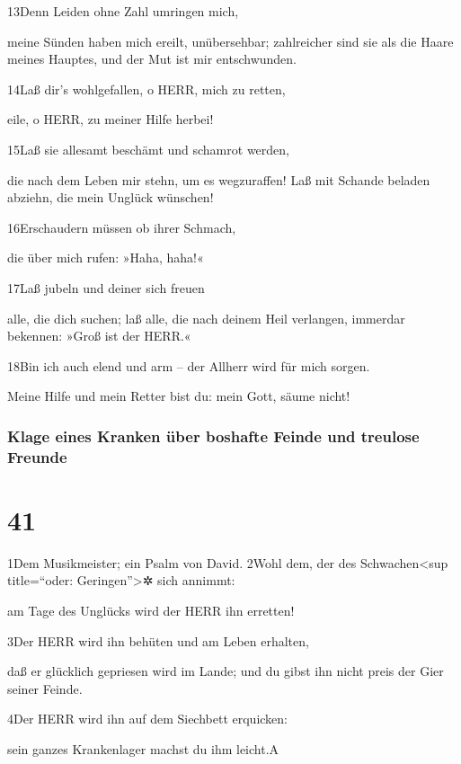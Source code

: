 13Denn Leiden ohne Zahl umringen mich,

meine Sünden haben mich ereilt, unübersehbar; zahlreicher sind sie als
die Haare meines Hauptes, und der Mut ist mir entschwunden.

14Laß dir's wohlgefallen, o HERR, mich zu retten,

eile, o HERR, zu meiner Hilfe herbei!

15Laß sie allesamt beschämt und schamrot werden,

die nach dem Leben mir stehn, um es wegzuraffen! Laß mit Schande beladen
abziehn, die mein Unglück wünschen!

16Erschaudern müssen ob ihrer Schmach,

die über mich rufen: »Haha, haha!«

17Laß jubeln und deiner sich freuen

alle, die dich suchen; laß alle, die nach deinem Heil verlangen,
immerdar bekennen: »Groß ist der HERR.«

18Bin ich auch elend und arm -- der Allherr wird für mich sorgen.

Meine Hilfe und mein Retter bist du: mein Gott, säume nicht!

\hypertarget{klage-eines-kranken-uxfcber-boshafte-feinde-und-treulose-freunde}{%
\subsubsection{Klage eines Kranken über boshafte Feinde und treulose
Freunde}\label{klage-eines-kranken-uxfcber-boshafte-feinde-und-treulose-freunde}}

\hypertarget{section-40}{%
\section{41}\label{section-40}}

1Dem Musikmeister; ein Psalm von David. 2Wohl dem, der des
Schwachen\textless sup title=``oder: Geringen''\textgreater✲ sich
annimmt:

am Tage des Unglücks wird der HERR ihn erretten!

3Der HERR wird ihn behüten und am Leben erhalten,

daß er glücklich gepriesen wird im Lande; und du gibst ihn nicht preis
der Gier seiner Feinde.

4Der HERR wird ihn auf dem Siechbett erquicken:

sein ganzes Krankenlager machst du ihm leicht.{A}

